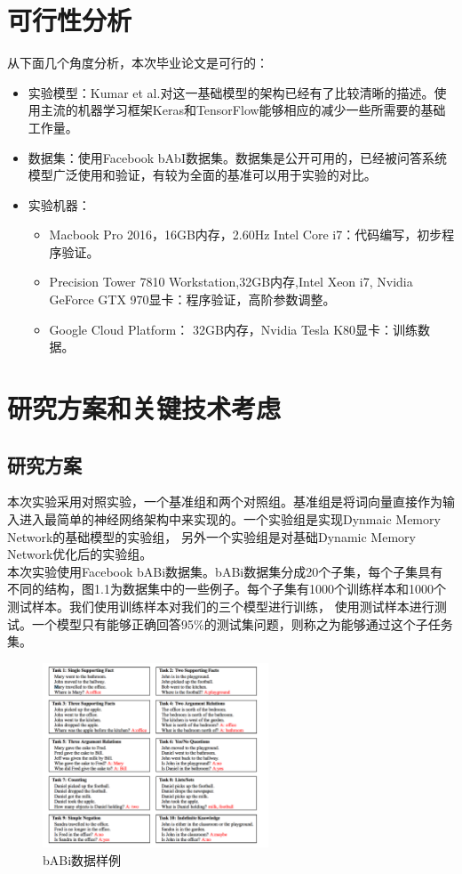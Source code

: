 \section{可行性分析}
从下面几个角度分析，本次毕业论文是可行的：
\begin{itemize}
\item 实验模型：Kumar et al.\cite{DBLP:journals/corr/KumarISBEPOGS15}对这一基础模型的架构已经有了比较清晰的描述。使用主流的机器学习框架Keras和TensorFlow能够相应的减少一些所需要的基础工作量。
\item 数据集：使用Facebook bAbI数据集。数据集是公开可用的，已经被问答系统模型广泛使用和验证，有较为全面的基准可以用于实验的对比。
\item 实验机器：
    \begin{itemize}
    \item Macbook Pro 2016，16GB内存，2.60Hz Intel Core i7：代码编写，初步程序验证。
    \item Precision Tower 7810 Workstation,32GB内存,Intel Xeon i7, Nvidia GeForce GTX 970显卡：程序验证，高阶参数调整。
    \item Google Cloud Platform： 32GB内存，Nvidia Tesla K80显卡：训练数据。 
    \end{itemize}
\end{itemize}
\section{研究方案和关键技术考虑}
\subsection{研究方案}
本次实验采用对照实验，一个基准组和两个对照组。基准组是将词向量直接作为输入进入最简单的神经网络架构中来实现的。一个实验组是实现Dynmaic Memory Network的基础模型的实验组，
另外一个实验组是对基础Dynamic Memory Network优化后的实验组。\\
本次实验使用Facebook bABi数据集。bABi数据集分成20个子集，每个子集具有不同的结构，图1.1为数据集中的一些例子\cite{DBLP:journals/corr/WestonBCM15}。每个子集有1000个训练样本和1000个测试样本。我们使用训练样本对我们的三个模型进行训练，
使用测试样本进行测试。一个模型只有能够正确回答95\%的测试集问题，则称之为能够通过这个子任务集。
\begin{figure}[h]
    \centering
    \includegraphics[width=0.6\textwidth]{./images/dataset-example}
      \caption{bABi数据样例}
    \end{figure} 
